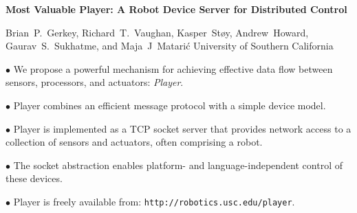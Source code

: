 \documentclass[times]{article}
\begin{document}
\begin{center}
{\Huge {\bf Most Valuable Player: A Robot Device Server for Distributed 
            Control}
\vspace{1em}
}

{\huge Brian~P.~Gerkey, Richard~T.~Vaughan, Kasper~St{\o}y,
       Andrew~Howard, Gaurav~S.~Sukhatme, and Maja~J~Matari\'{c}
       University of Southern California}
\end{center}


{\huge
\noindent
$\bullet$ We propose a powerful mechanism for achieving effective data flow 
between sensors, processors, and actuators: {\sl Player}.\\
}

\begin{floatingfigure}{1.95in}
\begin{center}
\end{center}
\end{floatingfigure}

{\huge
\noindent
$\bullet$ Player combines an efficient message protocol with a simple 
device model.\\
}

{\huge
\noindent
$\bullet$ Player is implemented as a TCP socket server 
that provides network access to a collection
of sensors and actuators, often comprising a robot. \\
}

{\huge
\noindent
$\bullet$ The socket abstraction enables platform- and language-independent 
control of these devices.\\ 
}

{\huge
\noindent
$\bullet$ Player is freely available from:
{\Large \verb+http://robotics.usc.edu/player+}.\\
}
\end{document}
